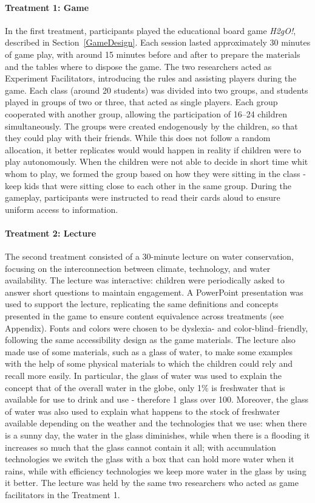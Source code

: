 \documentclass[preprint,12pt]{elsarticle}
\begin{document}
\paragraph{Treatment 1: Game}
In the first treatment, participants played the educational board game \textit{H2gO!}, described in Section~\ref{GameDesign}. Each session lasted approximately 30 minutes of game play, with around 15 minutes before and after to prepare the materials and the tables where to dispose the game. The two researchers acted as Experiment Facilitators, introducing the rules and assisting players during the game. Each class (around 20 students) was divided into two groups, and students played in groups of two or three, that acted as single players. Each group cooperated with another group, allowing the participation of 16–24 children simultaneously. The groups were created endogenously by the children, so that they could play with their friends. While this does not follow a random allocation, it better replicates would would happen in reality if children were to play autonomously. When the children were not able to decide in short time whit whom to play, we formed the group based on how they were sitting in the class - keep kids that were sitting close to each other in the same group.
During the gameplay, participants were instructed to read their cards aloud to ensure uniform access to information.


\paragraph{Treatment 2: Lecture}
The second treatment consisted of a 30-minute lecture on water conservation, focusing on the interconnection between climate, technology, and water availability. The lecture was interactive: children were periodically asked to answer short questions to maintain engagement. A PowerPoint presentation was used to support the lecture, replicating the same definitions and concepts presented in the game to ensure content equivalence across treatments (see Appendix). Fonts and colors were chosen to be dyslexia- and color-blind–friendly, following the same accessibility design as the game materials. The lecture also made use of some materials, such as a glass of water, to make some examples with the help of some physical materials to which the children could rely and recall more easily. In particular, the glass of water was used to explain the concept that of the overall water in the globe, only 1\% is freshwater that is available for use to drink and use - therefore 1 glass over 100. Moreover, the glass of water was also used to explain what happens to the stock of freshwater available depending on the weather and the technologies that we use: when there is a sunny day, the water in the glass diminishes, while when there is a flooding it increases so much that the glass cannot contain it all; with accumulation technologies we switch the glass with a box that can hold more water when it rains, while with efficiency technologies we keep more water in the glass by using it better.
The lecture was held by the same two researchers who acted as game facilitators in the Treatment 1.
\end{document}
